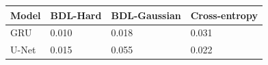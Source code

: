 \begin{tabular}{llll}
\toprule
Model & BDL-Hard & BDL-Gaussian & Cross-entropy \\
\midrule
GRU & 0.010 & 0.018 & 0.031 \\
U-Net & 0.015 & 0.055 & 0.022 \\
\bottomrule
\end{tabular}
